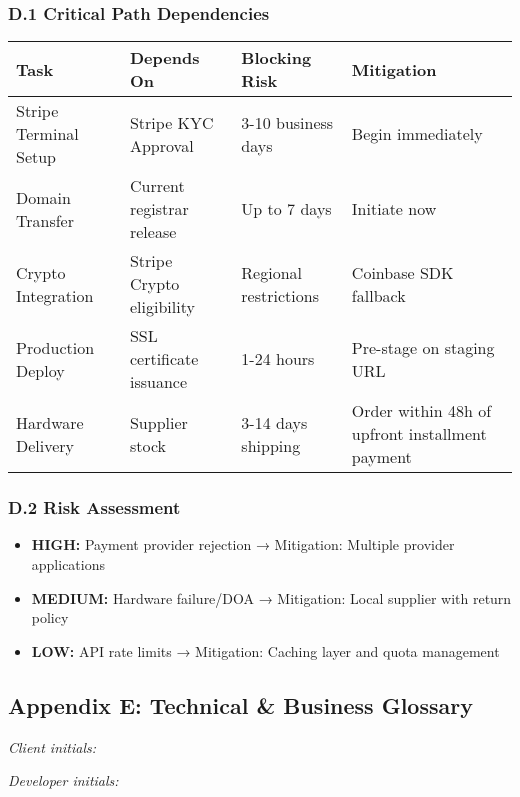 \documentclass[11pt, a4paper]{article}
\begin{document}
\subsubsection*{D.1 Critical Path Dependencies}
\begin{center}
\small
\begin{tabular}{|l|l|p{5cm}|l|}
\hline
\rowcolor{lightgray}
\textbf{Task} & \textbf{Depends On} & \textbf{Blocking Risk} & \textbf{Mitigation}\\
\hline
Stripe Terminal Setup & Stripe KYC Approval & 3-10 business days & Begin immediately\\
\hline
Domain Transfer & Current registrar release & Up to 7 days & Initiate now\\
\hline
Crypto Integration & Stripe Crypto eligibility & Regional restrictions & Coinbase SDK fallback\\
\hline
Production Deploy & SSL certificate issuance & 1-24 hours & Pre-stage on staging URL\\
\hline
Hardware Delivery & Supplier stock & 3-14 days shipping & Order within 48h of upfront installment payment\\
\hline
\end{tabular}
\end{center}

\subsubsection*{D.2 Risk Assessment}
\begin{itemize}[leftmargin=*]
\item \textbf{HIGH:} Payment provider rejection → Mitigation: Multiple provider applications
\item \textbf{MEDIUM:} Hardware failure/DOA → Mitigation: Local supplier with return policy
\item \textbf{LOW:} API rate limits → Mitigation: Caching layer and quota management
\end{itemize}

\subsection*{Appendix E: Technical \& Business Glossary}
\label{appendix:glossary}
\noindent
\begin{minipage}[t]{0.45\textwidth}
\textit{Client initials: }\TextField[name=init_client_E,width=1.6cm,bordercolor={0.7 0.7 0.7}]{}
\end{minipage}%
\hfill%
\begin{minipage}[t]{0.45\textwidth}
\raggedleft
\textit{Developer initials: }\TextField[name=init_dev_E,width=1.6cm,bordercolor={0.7 0.7 0.7}]{}
\end{minipage}
\vspace{0.3cm}
\end{document}
